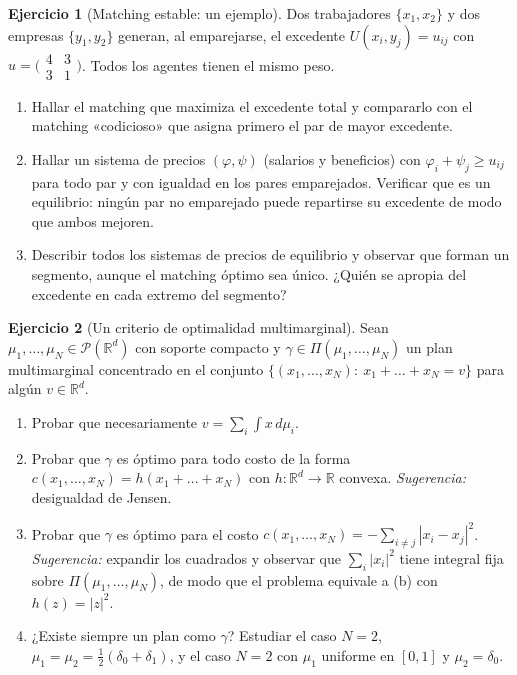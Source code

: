 \documentclass[11pt,a4paper]{amsart}
\newcounter{chapter}
\newcommand{\R}{{\mathbb R}}
\theoremstyle{remark}
\theoremstyle{definition}
\newtheorem{ejercicio}{Ejercicio}[chapter]
\numberwithin{subsection}{section}
\numberwithin{equation}{section}
\begin{document}
\begin{ejercicio}[Matching estable: un ejemplo]\label{ejer.matching.ejemplo}
Dos trabajadores $\{x_1,x_2\}$ y dos empresas $\{y_1,y_2\}$ generan, al
emparejarse, el excedente $U(x_i,y_j)=u_{ij}$ con
$u=\bigl(\begin{smallmatrix}4&3\\3&1\end{smallmatrix}\bigr)$. Todos los
agentes tienen el mismo peso.
\begin{enumerate}[label=(\alph*)]
\item Hallar el matching que maximiza el excedente total y compararlo con
el matching «codicioso» que asigna primero el par de mayor excedente.
\item Hallar un sistema de precios $(\varphi,\psi)$ (salarios y beneficios)
con $\varphi_i+\psi_j\ge u_{ij}$ para todo par y con igualdad en los pares
emparejados. Verificar que es un equilibrio: ningún par no emparejado puede
repartirse su excedente de modo que ambos mejoren.
\item Describir todos los sistemas de precios de equilibrio y observar que
forman un segmento, aunque el matching óptimo sea único. ¿Quién se apropia
del excedente en cada extremo del segmento?
\end{enumerate}
\end{ejercicio}

\begin{ejercicio}[Un criterio de optimalidad multimarginal]\label{ejer.multimarginal.criterio}
Sean $\mu_1,\dots,\mu_N\in\mathcal P(\R^d)$ con soporte compacto y
$\gamma\in\Pi(\mu_1,\dots,\mu_N)$ un plan multimarginal concentrado en el
conjunto $\{(x_1,\dots,x_N):\ x_1+\dots+x_N=v\}$ para algún $v\in\R^d$.
\begin{enumerate}[label=(\alph*)]
\item Probar que necesariamente $v=\sum_i\int x\,d\mu_i$.
\item Probar que $\gamma$ es óptimo para todo costo de la forma
$c(x_1,\dots,x_N)=h(x_1+\dots+x_N)$ con $h\colon\R^d\to\R$ convexa.
\emph{Sugerencia:} desigualdad de Jensen.
\item Probar que $\gamma$ es óptimo para el costo
$c(x_1,\dots,x_N)=-\sum_{i\ne j}|x_i-x_j|^2$. \emph{Sugerencia:} expandir
los cuadrados y observar que $\sum_i|x_i|^2$ tiene integral fija sobre
$\Pi(\mu_1,\dots,\mu_N)$, de modo que el problema equivale a (b) con
$h(z)=|z|^2$.
\item ¿Existe siempre un plan como $\gamma$? Estudiar el caso $N=2$,
$\mu_1=\mu_2=\frac12(\delta_0+\delta_1)$, y el caso $N=2$ con $\mu_1$
uniforme en $[0,1]$ y $\mu_2=\delta_0$.
\end{enumerate}
\end{ejercicio}
\end{document}
